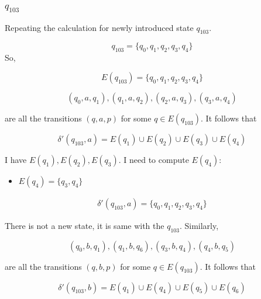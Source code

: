 \begin{center}
\subsubsection*{$q_{103}$}
\end{center}

Repeating the calculation for newly introduced state $q_{103}$.

\begin{equation*}
    q_{103} = \{ q_{0}, q_{1}, q_{2}, q_{3}, q_{4} \}
\end{equation*}
So,

\begin{equation*}
    E(q_{103}) = \{ q_{0}, q_{1}, q_{2}, q_{3}, q_{4} \}
\end{equation*}

\begin{equation*}
    (q_{0}, a, q_{1}), (q_{1}, a, q_{2}), (q_{2}, a, q_{3}), (q_{3}, a, q_{4})
\end{equation*}

\noindent are all the transitions $(q, a, p)$ for some $q \in E(q_{103})$. It follows that

\begin{equation*}
    \delta'(q_{103}, a) = E(q_{1}) \cup E(q_{2}) \cup E(q_{3}) \cup E(q_{4})
\end{equation*}

\noindent I have $E(q_{1}), E(q_{2}), E(q_{3})$. I need to compute $E(q_{4})$:
\begin{itemize}
    \item $E(q_{4}) = \{ q_{3}, q_{4} \}$
\end{itemize}

\begin{align*}
    \delta'(q_{103}, a) = \{ q_{0}, q_{1}, q_{2}, q_{3}, q_{4} \}
\end{align*}

\noindent There is not a new state, it is same with the $q_{103}$. Similarly,

\begin{equation*}
    (q_{0}, b, q_{1}), (q_{1}, b, q_{6}), (q_{3}, b, q_{4}), (q_{4}, b, q_{5})
\end{equation*}

\noindent are all the transitions $(q, b, p)$ for some $q \in E(q_{103})$. It follows that

\begin{equation*}
    \delta'(q_{103}, b) = E(q_{1}) \cup E(q_{4}) \cup E(q_{5}) \cup E(q_{6})
\end{equation*}

